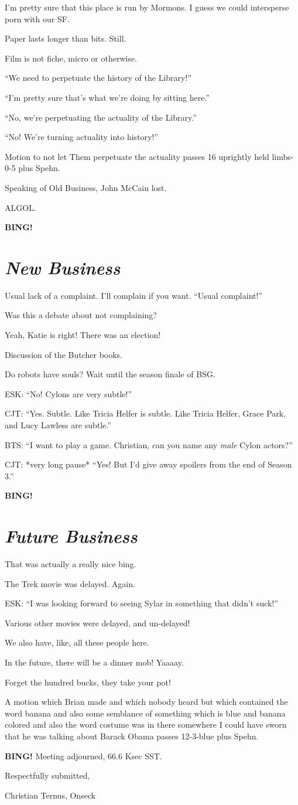 \documentclass[10pt]{article}
\newcommand{\bing}{{\bf BING!} }
\newcommand{\goto}[1]{\bing \vskip 12pt \section*{{\em{#1}}}}
\newcommand{\ps}{ plus Spehn\xspace}
\begin{document}
I'm pretty sure that this place is run by Mormons.  I guess we could
intersperse porn with our SF.

Paper lasts longer than bits.  Still.

Film is not fiche, micro or otherwise.

``We need to perpetuate the history of the Library!''

``I'm pretty sure that's what we're doing by sitting here.''

``No, we're perpetuating the actuality of the Library.''

``No!  We're turning actuality into history!''

Motion to not let Them perpetuate the actuality passes 16 uprightly held limbs-0-5 \ps.

Speaking of Old Business, John McCain lost.

ALGOL.

\goto{New Business}

Usual lack of a complaint.  I'll complain if you want.  ``Usual complaint!''

Was this a debate about not complaining?

Yeah, Katie is right!  There was an election!

Discussion of the Butcher books.

Do robots have souls?  Wait until the season finale of BSG.

ESK: ``No!  Cylons are very subtle!''

CJT: ``Yes.  Subtle.  Like Tricia Helfer is subtle.  Like Tricia Helfer, Grace Park, and Lucy Lawless are subtle.''

BTS: ``I want to play a game.  Christian, can you name any \emph{male} Cylon actors?''

CJT: *very long pause* ``Yes!  But I'd give away spoilers from the end of Season 3.'' 

\goto{Future Business}

That was actually a really nice bing.

The Trek movie was delayed.  Again.

ESK:  ``I was looking forward to seeing Sylar in something that didn't suck!''

Various other movies were delayed, and un-delayed!

We also have, like, all these people here.

In the future, there will be a dinner mob!  Yaaaay.

Forget the hundred bucks, they take your pot!

A motion which Brian made and which nobody heard but which contained
the word banana and also some semblance of something which is blue and
banana colored and also the word costume was in there somewhere I
could have sworn that he was talking about Barack Obama passes
12-3-blue \ps.

\bing
\noindent
Meeting adjourned, 66.6 Ksec SST.

\vspace{18pt}

\centerline{Respectfully submitted,}
\centerline{Christian Ternus, Onseck}
\end{document}
